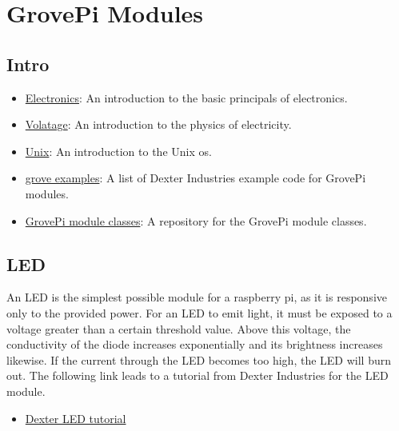 \FILENAME

\section{GrovePi Modules}\label{grovepi-modules}

\subsection{Intro}\label{intro}

\begin{itemize}
\tightlist
\item
  \href{http://www.instructables.com/id/Basic-Electronics}{Electronics}:
  An introduction to the basic principals of electronics.
\item
  \href{https://learn.sparkfun.com/tutorials/voltage-current-resistance-and-ohms-law}{Volatage}:
  An introduction to the physics of electricity.
\item
  \href{https://info-ee.eps.surrey.ac.uk/Teaching/Unix/index.html}{Unix}:
  An introduction to the Unix os.
\item
  \href{https://github.com/DexterInd/GrovePi/tree/master/Software/Python}{grove
  examples}: A list of Dexter Industries example code for GrovePi
  modules.
\item
  \href{https://github.com/cloudmesh/cloudmesh.pi/tree/master/cloudmesh/pi}{GrovePi
  module classes}: A repository for the GrovePi module classes.
\end{itemize}

\subsection{LED}\label{led}

An LED is the simplest possible module for a raspberry pi, as it is
responsive only to the provided power. For an LED to emit light, it must
be exposed to a voltage greater than a certain threshold value. Above
this voltage, the conductivity of the diode increases exponentially and
its brightness increases likewise. If the current through the LED
becomes too high, the LED will burn out. The following link leads to a
tutorial from Dexter Industries for the LED module.

\begin{itemize}
\tightlist
\item
  \href{https://www.dexterindustries.com/GrovePi/projects-for-the-raspberry-pi/raspberry-pi-led-tutorial/}{Dexter
  LED tutorial}
\end{itemize}

